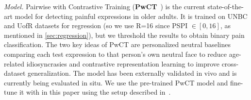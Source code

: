 \documentclass{article}
\theoremstyle{plain}
\theoremstyle{definition}
\theoremstyle{remark}
\begin{document}
\textit{Model.} Pairwise with Contrastive Training (\textbf{PwCT}~\citep{rezaei2020unobtrusive}) is the current state-of-the-art model for detecting painful expressions in older adults. It is trained on UNBC and UofR datasets for regression (so we use R=16 since PSPI $\in [0,16]$, as mentioned in \ref{sec:regression}), but we threshold the results to obtain binary pain classification. The two key ideas of PwCT are personalized neutral baselines comparing each test expression to that person's own neutral face to reduce age-related idiosyncrasies and contrastive representation learning to improve cross-dataset generalization. The model has been externally validated in vivo and is currently being evaluated in situ. We use the pre-trained PwCT model and fine-tune it with \synpain in this paper using the setup described in~\citet{rezaei2020unobtrusive}.
\end{document}
